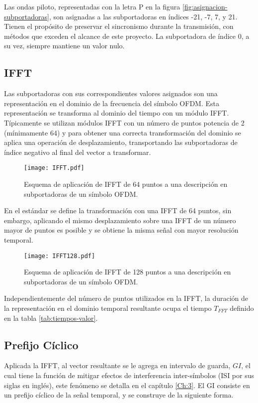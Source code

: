 Las ondas piloto, representadas con la letra P en la figura \ref{fig:asignacion-subportadoras}, son asignadas a las subportadoras en índices -21, -7, 7, y 21. Tienen el propósito de preservar el sincronismo durante la transmisión, con métodos que exceden el alcance de este proyecto. La subportadora de índice 0, a su vez, siempre mantiene un valor nulo. 

\subsection{IFFT}
\label{Ss:ch2-ifft}
Las subportadoras con sus correspondientes valores asignados son una representación en el dominio de la frecuencia del símbolo OFDM. Esta representación se transforma al dominio del tiempo con un módulo IFFT. Típicamente se utilizan módulos IFFT con un número de puntos potencia de 2 (mínimamente 64) y para obtener una correcta transformación del dominio se aplica una operación de desplazamiento, transportando las subportadoras de índice negativo al final del vector a transformar.\\
\begin{figure}[ht]
    \centering{}\texttt{[image: IFFT.pdf]}
    \caption{Esquema de aplicación de IFFT de 64 puntos a una descripción en subportadoras de un símbolo OFDM.\label{fig:ifft64}}  
\end{figure}

En el estándar se define la transformación con una IFFT de 64 puntos, sin embargo, aplicando el mismo desplazamiento sobre una IFFT de un número mayor de puntos es posible y se obtiene la misma señal con mayor resolución temporal.\\
\begin{figure}[ht]
    \centering{}\texttt{[image: IFFT128.pdf]}
    \caption{Esquema de aplicación de IFFT de 128 puntos a una descripción en subportadoras de un símbolo OFDM.\label{fig:ifft128}}  
\end{figure}

Independientemente del número de puntos utilizados en la IFFT, la duración de la representación en el dominio temporal resultante ocupa el tiempo $T_{FFT}$ definido en la tabla \ref{tab:tiempos-valor}.

\subsection{Prefijo Cíclico}
\label{Ss:ch2-prefijo}

Aplicada la IFFT, al vector resultante se le agrega en intervalo de guarda, $GI$, el cual tiene la función de mitigar efectos de interferencia inter-símbolos (ISI por sus siglas en inglés), este fenómeno se detalla en el capítulo \ref{Ch:3}. El GI consiste en un prefijo cíclico de la señal temporal, y se construye de la siguiente forma.

